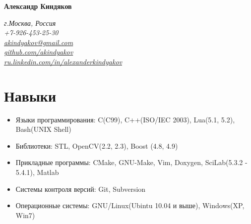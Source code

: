 \documentclass[a4paper, 11pt]{article}
\begin{document}
{\LARGE\textbf{Александр Киндяков}}

\begin{flushright}
    {\itshape
        г.Москва, Россия \\
        +7-926-453-25-30 \\
        \href{mailto:akindyakov@gmail.com}{akindyakov@gmail.com} \\
        \href{https://github.com/akindyakov}{github.com/akindyakov} \\
        \href{http://ru.linkedin.com/in/alexanderkindyakov}{ru.linkedin.com/in/alexanderkindyakov} \\
    }
\end{flushright}


\section{Навыки}
\begin{itemize}
    \item Языки программирования:   C(C99), C++(ISO/IEC 2003), Lua(5.1, 5.2), Bash(UNIX Shell)
    \item Библиотеки:               STL, OpenCV(2.2, 2.3), Boost (4.8, 4.9)
    \item Прикладные программы:     CMake, GNU-Make, Vim, Doxygen, SciLab(5.3.2 - 5.4.1), Matlab
    \item Системы контроля версий:  Git, Subversion
    \item Операционные системы:     GNU/Linux(Ubintu 10.04 и выше), Windows(XP, Win7)
\end{itemize}
\end{document}
